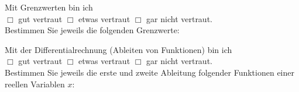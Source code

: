 \documentclass[12pt,answers]{exam}
\begin{document}
\begin{questions}
Mit Grenzwerten bin ich \\ $\Box$ gut vertraut \hfill $\Box$ etwas vertraut \hfill $\Box$ gar nicht vertraut. \\[2ex]
Bestimmen Sie jeweils die folgenden Grenzwerte:\\
\begin{solution}
\end{solution}
\pagebreak


Mit der Differentialrechnung (Ableiten von Funktionen) bin ich \\ $\Box$ gut vertraut \hfill $\Box$ etwas vertraut \hfill $\Box$ gar nicht vertraut. \\[2ex]
Bestimmen Sie jeweils die erste und zweite Ableitung folgender
Funktionen einer reellen Variablen $x$:\\
\begin{solution}
\begin{parts}


\end{parts}
\end{solution}
\end{questions}
\end{document}
